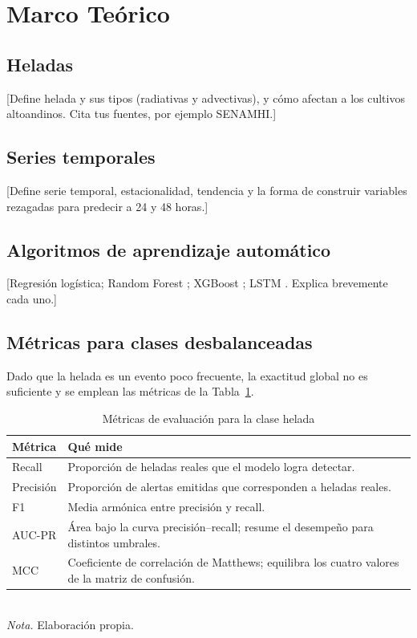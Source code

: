 \section{Marco Teórico}
\label{sec:marco}

\subsection{Heladas}
[Define helada y sus tipos (radiativas y advectivas), y cómo afectan a los cultivos altoandinos. Cita tus fuentes, por ejemplo SENAMHI.]

\subsection{Series temporales}
[Define serie temporal, estacionalidad, tendencia y la forma de construir variables rezagadas para predecir a 24 y 48 horas.]

\subsection{Algoritmos de aprendizaje automático}
[Regresión logística; Random Forest \cite{breiman2001}; XGBoost \cite{chen2016}; LSTM \cite{hochreiter1997}. Explica brevemente cada uno.]

\subsection{Métricas para clases desbalanceadas}
Dado que la helada es un evento poco frecuente, la exactitud global no es suficiente y se emplean las métricas de la Tabla~\ref{tab:metricas}.

\begin{table}[ht]
\centering
\caption{Métricas de evaluación para la clase helada}
\label{tab:metricas}
\begin{tabular}{@{}p{3cm}p{11cm}@{}}
\toprule
\textbf{Métrica} & \textbf{Qué mide} \\
\midrule
Recall & Proporción de heladas reales que el modelo logra detectar. \\
Precisión & Proporción de alertas emitidas que corresponden a heladas reales. \\
F1 & Media armónica entre precisión y recall. \\
AUC-PR & Área bajo la curva precisión--recall; resume el desempeño para distintos umbrales. \\
MCC & Coeficiente de correlación de Matthews; equilibra los cuatro valores de la matriz de confusión. \\
\bottomrule
\end{tabular}\\
\textit{Nota.} Elaboración propia.
\end{table}